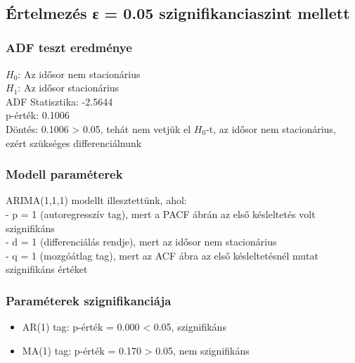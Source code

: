 \documentclass[11pt]{article}
\providecommand{\tightlist}{%
      \setlength{\itemsep}{0pt}\setlength{\parskip}{0pt}}
\begin{document}
    \begin{center}
    \end{center}
    { \hspace*{\fill} \\}
    
    \subsection{Értelmezés ε = 0.05 szignifikanciaszint
mellett}\label{uxe9rtelmezuxe9s-ux3b5-0.05-szignifikanciaszint-mellett}

\subsubsection{ADF teszt eredménye}\label{adf-teszt-eredmuxe9nye}

$H_0$: Az idősor nem stacionárius\\
$H_1$: Az idősor stacionárius\\
ADF Statisztika: -2.5644\\
p-érték: 0.1006\\
Döntés: 0.1006 \textgreater{} 0.05, tehát nem vetjük el $H_0$-t, az idősor
nem stacionárius, ezért szükséges differenciálnunk

\subsubsection{Modell paraméterek}\label{modell-paramuxe9terek}

ARIMA(1,1,1) modellt illesztettünk, ahol:\\
- p = 1 (autoregresszív tag), mert a PACF ábrán az első késleltetés volt
szignifikáns\\
- d = 1 (differenciálás rendje), mert az idősor nem stacionárius\\
- q = 1 (mozgóátlag tag), mert az ACF ábra az első késleltetésnél mutat
szignifikáns értéket

\subsubsection{Paraméterek
szignifikanciája}\label{paramuxe9terek-szignifikanciuxe1ja}

\begin{itemize}
\tightlist
\item
  AR(1) tag: p-érték = 0.000 \textless{} 0.05, szignifikáns\\
\item
  MA(1) tag: p-érték = 0.170 \textgreater{} 0.05, nem szignifikáns
\end{itemize}
\end{document}
